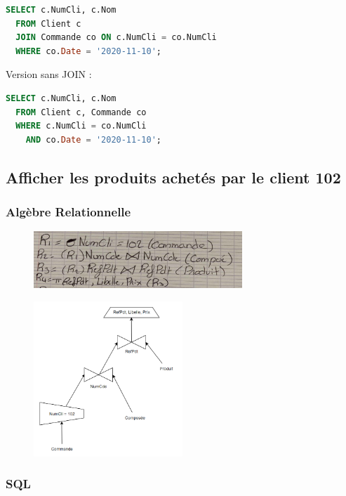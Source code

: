 \documentclass{article}
\begin{document}
\begin{lstlisting}[language=SQL]
  SELECT c.NumCli, c.Nom 
  FROM Client c
  JOIN Commande co ON c.NumCli = co.NumCli
  WHERE co.Date = '2020-11-10';
\end{lstlisting}

Version sans JOIN :

\begin{lstlisting}[language=SQL]
  SELECT c.NumCli, c.Nom 
  FROM Client c, Commande co 
  WHERE c.NumCli = co.NumCli 
    AND co.Date = '2020-11-10';
\end{lstlisting}

\subsection{Afficher les produits achetés par le client 102}

\subsubsection{Algèbre Relationnelle}

\begin{figure}[H]
  \centering
  \includegraphics[width=0.7\textwidth]{alg/5.png}
  \label{fig:alg-rel}
\end{figure}

\begin{figure}[H]
  \centering
  \includegraphics[width=0.5\textwidth]{algRel/5.png}
  \label{fig:alg-rel}
\end{figure}


\subsubsection{SQL}
\end{document}
